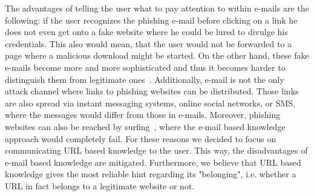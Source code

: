 \begin{description}[leftmargin=0cm]
	\item[URL Based Knowledge as Learning Content] The advantages of telling the user what to pay attention to within e-mails are the following: if the user recognizes the phishing e-mail before clicking on a link he does not even get onto a fake website where he could be lured to divulge his credentials. This also would mean, that the user would not be forwarded to a page where a malicious download might be started. On the other hand, these fake e-mails become more and more sophisticated and thus it becomes harder to distinguish them from legitimate ones~\cite{microsoftphishing, spamfighter}. Additionally, e-mail is not the only attack channel where links to phishing websites can be distributed.  Those links are also spread via instant messaging systems, online social networks, or SMS, where the messages would differ from those in e-mails. Moreover, phishing websites can also be reached by surfing~\cite{kasperskyreport2013}, where the e-mail based knowledge approach would completely fail. For these reasons we decided to focus on communicating URL based knowledge to the user. This way, the disadvantages of e-mail based knowledge are mitigated. Furthermore, we believe that URL based knowledge gives the most reliable hint regarding its "belonging", i.e. whether a URL in fact belongs to a legitimate website or not.

\end{description}
